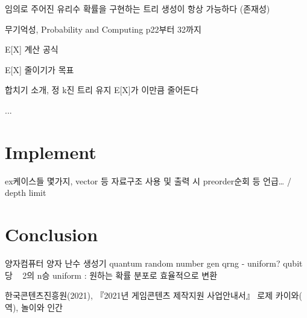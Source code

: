 \documentclass[11pt]{article}
\begin{document}
임의로 주어진 유리수 확률을 구현하는 트리 생성이 항상 가능하다 (존재성)

무기억성, Probability and Computing p22부터 32까지

E[X] 계산 공식

E[X] 줄이기가 목표

합치기 소개, 정 k진 트리 유지 E[X]가 이만큼 줄어든다

...


\section{Implement}
ex케이스들 몇가지, vector 등 자료구조 사용 및 출력 시 preorder순회 등 언급… / depth limit

\section{Conclusion}
양자컴퓨터 양자 난수 생성기
quantum random number gen qrng - uniform?
qubit 당 ~ 2의 n승 uniform : 원하는 확률 분포로 효율적으로 변환

\begin{thebibliography}{99}
한국콘텐츠진흥원(2021), 『2021년 게임콘텐츠 제작지원 사업안내서』
로제 카이와( 역), 놀이와 인간

\end{thebibliography}
\end{document}
